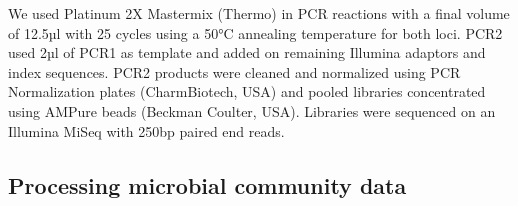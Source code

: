 \documentclass[
  10pt,
  letterpaper,
  DIV=11,
  numbers=noendperiod]{scrartcl}
\begin{document}
We used Platinum 2X Mastermix (Thermo) in PCR reactions with a final
volume of 12.5µl with 25 cycles using a 50°C annealing temperature for
both loci. PCR2 used 2µl of PCR1 as template and added on remaining
Illumina adaptors and index sequences. PCR2 products were cleaned and
normalized using PCR Normalization plates (CharmBiotech, USA) and pooled
libraries concentrated using AMPure beads (Beckman Coulter, USA).
Libraries were sequenced on an Illumina MiSeq with 250bp paired end
reads.

\hypertarget{processing-microbial-community-data}{%
\subsection{Processing microbial community
data}\label{processing-microbial-community-data}}
\end{document}

